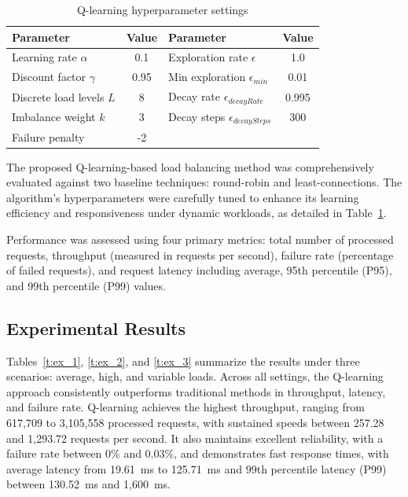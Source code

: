 \documentclass[lnbip]{svmultln}
\begin{document}
\begin{table}[htbp]
\caption{Q-learning hyperparameter settings}
\begin{center}
    \begin{tabular}{|l|c|l|c|}
        \hline
        \textbf{Parameter} & \textbf{Value} & \textbf{Parameter} & \textbf{Value} \\
        \hline
        Learning rate $\alpha$         & 0.1   & Exploration rate $\epsilon$       & 1.0   \\
        Discount factor $\gamma$       & 0.95  & Min exploration $\epsilon_{min}$ & 0.01  \\
        Discrete load levels $L$       & 8     & Decay rate $\epsilon_{decayRate}$ & 0.995 \\
        Imbalance weight $k$           & 3     & Decay steps $\epsilon_{decaySteps}$ & 300 \\
        Failure penalty                & -2    &                                   &       \\
        \hline
    \end{tabular}
    \label{t:es_3}
\end{center}
\end{table}

The proposed Q-learning-based load balancing method was comprehensively evaluated against two baseline techniques: round-robin and least-connections. The algorithm's hyperparameters were carefully tuned to enhance its learning efficiency and responsiveness under dynamic workloads, as detailed in Table~\ref{t:es_3}. 

Performance was assessed using four primary metrics: total number of processed requests, throughput (measured in requests per second), failure rate (percentage of failed requests), and request latency including average, 95th percentile (P95), and 99th percentile (P99) values.

\subsection{Experimental Results}\label{s:5.2}
Tables~\ref{t:ex_1}, \ref{t:ex_2}, and \ref{t:ex_3} summarize the results under three scenarios: average, high, and variable loads. Across all settings, the Q-learning approach consistently outperforms traditional methods in throughput, latency, and failure rate. Q-learning achieves the highest throughput, ranging from 617{,}709 to 3{,}105{,}558 processed requests, with sustained speeds between 257.28 and 1{,}293.72 requests per second. It also maintains excellent reliability, with a failure rate between 0\% and 0.03\%, and demonstrates fast response times, with average latency from 19.61~ms to 125.71~ms and 99th percentile latency (P99) between 130.52~ms and 1{,}600~ms.
\end{document}
